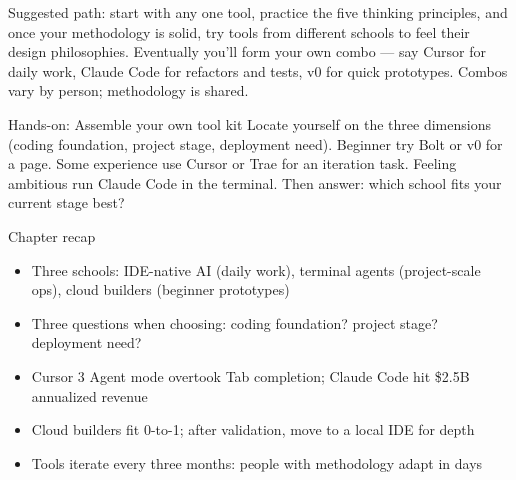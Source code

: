 Suggested path: start with any one tool, practice the five thinking principles, and once your methodology is solid, try tools from different schools to feel their design philosophies. Eventually you'll form your own combo — say Cursor for daily work, Claude Code for refactors and tests, v0 for quick prototypes. Combos vary by person; methodology is shared.

\begin{tcbpractice}{Hands-on: Assemble your own tool kit}
Locate yourself on the three dimensions (coding foundation, project stage, deployment need). Beginner try Bolt or v0 for a page. Some experience use Cursor or Trae for an iteration task. Feeling ambitious run Claude Code in the terminal. Then answer: which school fits your current stage best?

\end{tcbpractice}

\begin{tcbsummary}{Chapter recap}
\begin{itemize}
  \item Three schools: IDE-native AI (daily work), terminal agents (project-scale ops), cloud builders (beginner prototypes)
  \item Three questions when choosing: coding foundation? project stage? deployment need?
  \item Cursor 3 Agent mode overtook Tab completion; Claude Code hit \$2.5B annualized revenue
  \item Cloud builders fit 0-to-1; after validation, move to a local IDE for depth
  \item Tools iterate every three months: people with methodology adapt in days
\end{itemize}

\end{tcbsummary}
